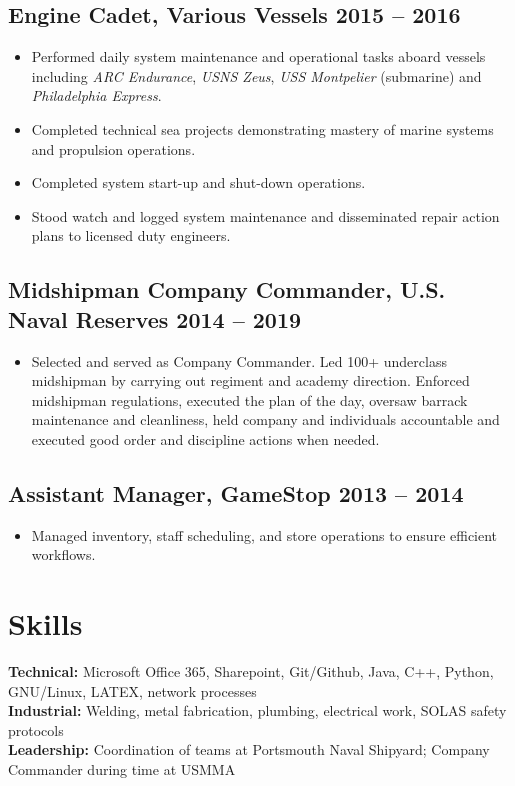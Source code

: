 \documentclass[10pt,a4paper]{article}
\begin{document}
\subsection{Engine Cadet, Various Vessels \hfill 2015 -- 2016}
\begin{itemize}[noitemsep]
    \item Performed daily system maintenance and operational tasks aboard vessels including \textit{ARC Endurance}, \textit{USNS Zeus}, \textit{USS Montpelier} (submarine)  and \textit{Philadelphia Express}.
    \item Completed technical sea projects demonstrating mastery of marine systems and propulsion operations.
    \item Completed system start-up and shut-down operations.
    \item Stood watch and logged system maintenance and disseminated repair action plans to licensed duty engineers.
\end{itemize}

\subsection{Midshipman Company Commander, U.S. Naval Reserves \hfill 2014 -- 2019}
\begin{itemize}[noitemsep]
    \item Selected and served as Company Commander. Led 100+ underclass midshipman by carrying out regiment and academy direction. Enforced midshipman regulations, executed the plan of the day, oversaw barrack maintenance and cleanliness, held company and individuals accountable and executed good order and discipline actions when needed.
\end{itemize}

\subsection{Assistant Manager, GameStop \hfill 2013 -- 2014}
\begin{itemize}[noitemsep]
    \item Managed inventory, staff scheduling, and store operations to ensure efficient workflows.
\end{itemize}

\section*{Skills}
\textbf{Technical:} Microsoft Office 365, Sharepoint, Git/Github, Java, C++, Python, GNU/Linux, LATEX, network processes \\
\textbf{Industrial:} Welding, metal fabrication, plumbing, electrical work, SOLAS safety protocols \\
\textbf{Leadership:} Coordination of teams at Portsmouth Naval Shipyard; Company Commander during time at USMMA \\
\end{document}
